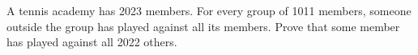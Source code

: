 A tennis academy has 2023 members. For every group of 1011 members, someone outside the group has played against all its members. Prove that some member has played against all 2022 others.
